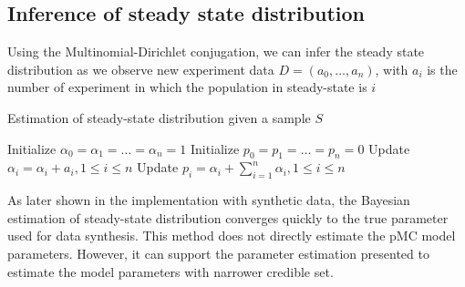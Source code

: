 \documentclass[12pt]{article}
\theoremstyle{definition}
\begin{document}
\subsection{Inference of steady state distribution}
Using the Multinomial-Dirichlet conjugation, we can infer the steady state
distribution as we observe new experiment data $D=(a_0,\ldots,a_n)$, with $a_i$
is the number of experiment in which the population in steady-state is $i$ 
\begin{algorithm}[H]
  \caption{Estimation of steady-state distribution given a sample $S$}\label{exp_a}
  \begin{algorithmic}[1]
    \State Initialize $\alpha_0=\alpha_1=\ldots=\alpha_n=1$
    \State Initialize $p_0=p_1=\ldots=p_n=0$
    \State Update $\alpha_i = \alpha_i + a_i, 1 \leq i \leq n$
    \State Update $p_i = \alpha_i + \sum_{i=1}^n \alpha_i, 1 \leq i \leq n$
    \EndProcedure
  \end{algorithmic}
\end{algorithm}

As later shown in the implementation with synthetic data, the Bayesian
estimation of steady-state distribution converges quickly to the true parameter
used for data synthesis. This method does not directly estimate the pMC
model parameters. However, it can support the parameter estimation presented
\cite{hajnal2019data} to estimate the model parameters with narrower credible
set.
\end{document}
